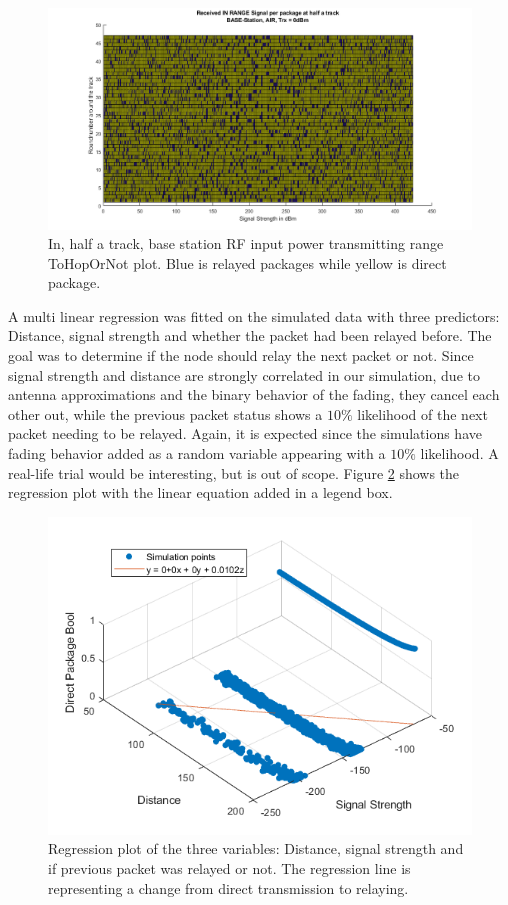 \begin{figure}[h]
	\centering
	\includegraphics[width=\linewidth]{theory/protocolDecisionExample/fig/recievedSignal_inRange_halfTrack.png}
	\caption{In, half a track, base station RF input power transmitting range ToHopOrNot plot. Blue is relayed packages while yellow is direct package.}
	\label{fig:recievedSignal_inRange_halfTrack}
\end{figure}

\noindent A multi linear regression was fitted on the simulated data with three predictors: Distance, signal strength and whether the packet had been relayed before. The goal was to determine if the node should relay the next packet or not. Since signal strength and distance are strongly correlated in our simulation, due to antenna approximations and the binary behavior of the fading, they cancel each other out, while the previous packet status shows a $10\%$ likelihood of the next packet needing to be relayed. Again, it is expected since the simulations have fading behavior added as a random variable appearing with a $10\%$ likelihood. A real-life trial would be interesting, but is out of scope. Figure \ref{fig:regressionPlot} shows the regression plot with the linear equation added in a legend box.

\begin{figure}[h]
	\centering
	\includegraphics[width=\linewidth]{theory/protocolDecisionExample/fig/regressionPlot.png}
	\caption{Regression plot of the three variables: Distance, signal strength and if previous packet was relayed or not. The regression line is representing a change from direct transmission to relaying.}
	\label{fig:regressionPlot}
\end{figure}